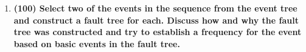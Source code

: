 \documentclass[11pt,a4paper]{article}
\begin{document}
\begin{enumerate}[leftmargin=*,topsep=0pt,font=\bfseries]
        
        
        
        
        
        
        
        
        
        
        
        
        
        
        
        
        
        
        
        
        
        
        
        
        
        
        
        
        
        
        
        
        
        \newpage
    \item\textbf{(100) Select two of the events in the sequence from the event tree and construct a fault tree for each. Discuss how and why the fault tree was constructed and try to establish a frequency for the event based on basic events in the fault tree.}
        \vspace{\baselineskip}





















































\end{enumerate}

\newpage 


\setlength{\bibhang}{0pt}

\end{document}
